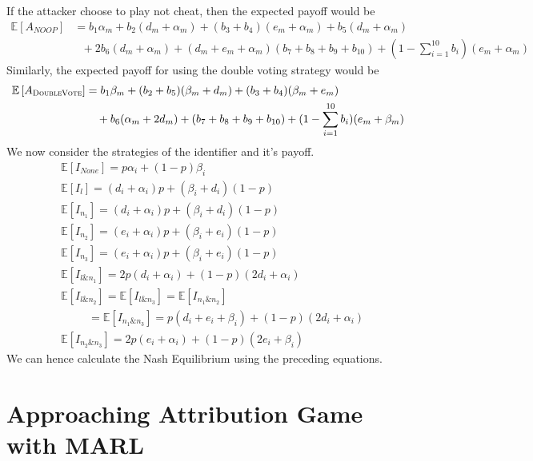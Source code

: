 \documentclass[a4paper,11pt]{article}
\begin{document}
If the attacker choose to play not cheat, then the expected payoff would be
\begin{align*}
    \mathbb{E}\left[A_{NOOP} \right] &= b_1\alpha_m + b_2(d_m + \alpha_m) + (b_3 + b_4)(e_m + \alpha_m) + b_5(d_m + \alpha_m) \\
    &\ \ \  + 2b_6(d_m + \alpha_m) + (d_m + e_m + \alpha_m)(b_7 + b_8 + b_9 + b_10) + (1 - \sum_{i = 1}^{10} b_i)(e_m + \alpha_m)
\end{align*}
Similarly, the expected payoff for using the double voting strategy would be 
\begin{align*}
    \mathbb{E}\left[A_{\textsc{DoubleVote}} \right] &= b_1\beta_m + (b_2 + b_5)(\beta_m + d_m) + (b_3 + b_4)(\beta_m + e_m) \\
    &\ \ \ + b_6(\alpha_m + 2d_m) + (b_7 + b_8 + b_9 + b_{10}) + (1 - \sum_{i = 1}^{10} b_i)(e_m + \beta_m)
\end{align*}
We now consider the strategies of the identifier and it's payoff.
\begin{align*}
    &\mathbb{E}\left[I_{None}\right] = p\alpha_i + (1 - p)\beta_i\\
    &\mathbb{E}\left[I_{l}\right] = (d_i + \alpha_i)p + (\beta_i + d_i)(1 - p)\\
    &\mathbb{E}\left[I_{n_1}\right] = (d_i + \alpha_i)p + (\beta_i + d_i)(1 - p)\\
    &\mathbb{E}\left[I_{n_2}\right] = (e_i + \alpha_i)p + (\beta_i + e_i)(1 - p)\\
    &\mathbb{E}\left[I_{n_3}\right] = (e_i + \alpha_i)p + (\beta_i + e_i)(1 - p)\\
    &\mathbb{E}\left[I_{l \& n_1}\right] = 2p(d_i + \alpha_i) + (1 - p)(2d_i + \alpha_i)\\
    &\mathbb{E}\left[I_{l \& n_2}\right] = \mathbb{E}\left[I_{l \& n_3}\right] = \mathbb{E}\left[I_{n_1 \& n_2}\right]\\ 
    &\ \ \ \ \ \ \ \ \ \ \ = \mathbb{E}\left[I_{n_1 \& n_3}\right] = p(d_i + e_i +\beta_i) + (1 - p)(2d_i + \alpha_i)\\
    &\mathbb{E}\left[I_{n_2 \& n_3}\right] = 2p(e_i + \alpha_i) + (1 - p)(2e_i + \beta_i)
\end{align*}
We can hence calculate the Nash Equilibrium using the preceding equations. 

\section{Approaching Attribution Game with MARL}\label{sec:marl_approach}
\end{document}
